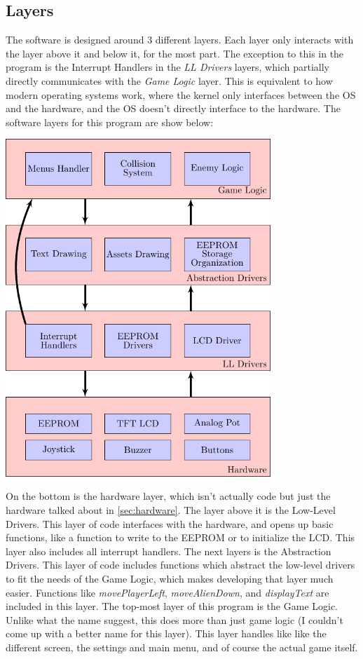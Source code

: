 \documentclass[12pt, a4paper]{article}
\newenvironment{Figure}
  {\par\medskip\noindent\minipage{\linewidth}\centering}
  {\endminipage\par\medskip}
\begin{document}
    \subsection{Layers}
    The software is designed around 3 different layers. Each layer only interacts with the layer above it and below it, for the most part. The exception to this in the program is the Interrupt Handlers in the \textit{LL Drivers} layers, which partially directly communicates with the \textit{Game Logic} layer. This is equivalent to how modern operating systems work, where the kernel only interfaces between the OS and the hardware, and the OS doesn't directly interface to the hardware. The software layers for this program are show below:
    \begin{Figure}\centering\includegraphics[width=0.75\textwidth]{TikzDrawings/highlevelorg.pdf}\end{Figure}
    On the bottom is the hardware layer, which isn't actually code but just the hardware talked about in \cref{sec:hardware}. 
    The layer above it is the Low-Level Drivers. This layer of code interfaces with the hardware, and opens up basic functions, like a function to write to the EEPROM or to initialize the LCD. This layer also includes all interrupt handlers. 
    The next layers is the Abstraction Drivers. This layer of code includes functions which abstract the low-level drivers to fit the needs of the Game Logic, which makes developing that layer much easier. Functions like \textit{movePlayerLeft}, \textit{moveAlienDown}, and \textit{displayText} are included in this layer.
    The top-most layer of this program is the Game Logic. Unlike what the name suggest, this does more than just game logic (I couldn't come up with a better name for this layer). This layer handles like like the different screen, the settings and main menu, and of course the actual game itself. 
    
\end{document}
